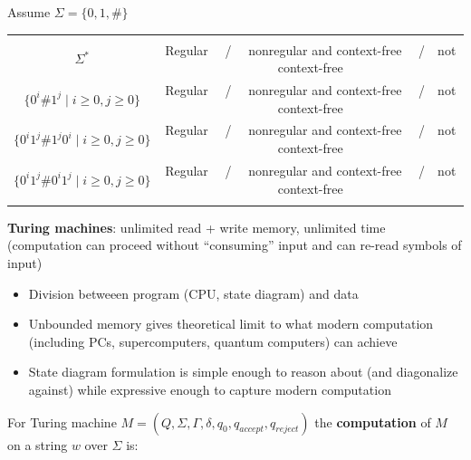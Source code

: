 \documentclass[12pt, oneside]{article}
\begin{document}
\vfill

Assume  $\Sigma  = \{0,1, \#\}$
\begin{center}
\begin{tabular}{|cc|}
\hline
&\\
$\Sigma^*$  & Regular ~~/~~ nonregular and context-free ~~/~~not context-free\\

$\{0^i\# 1^j \mid i \geq  0, j  \geq 0\}$  & Regular ~~/~~ nonregular and context-free ~~/~~not context-free\\

$\{0^i1^j\# 1^j0^i \mid i \geq  0, j  \geq 0\}$  & Regular ~~/~~ nonregular and context-free ~~/~~not context-free\\

$\{0^i1^j\# 0^i 1^j \mid i \geq  0, j  \geq 0\}$  & Regular ~~/~~ nonregular and context-free ~~/~~not context-free\\
&\\
\hline
\end{tabular}
\end{center}

\newpage
{\bf Turing machines}: unlimited read + write memory, unlimited time (computation can proceed
without ``consuming'' input and can re-read symbols of input)
\begin{itemize}
\item Division betweeen program (CPU, state diagram) and data
\item Unbounded memory gives theoretical limit to what modern computation 
(including PCs, supercomputers, quantum computers) can achieve
\item State diagram formulation is simple enough to reason about (and diagonalize against) while
expressive enough to capture modern computation
\end{itemize}

For Turing machine $M= (Q, \Sigma, \Gamma, \delta, q_0, q_{accept}, q_{reject})$ 
the {\bf computation} of $M$ on a string $w$ over $\Sigma$  is:

\vspace{-20pt}
\end{document}
